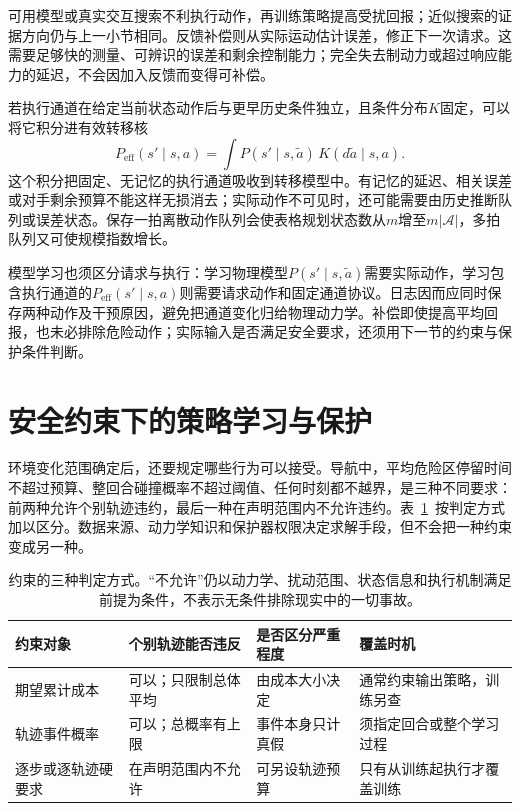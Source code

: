 可用模型或真实交互搜索不利执行动作，再训练策略提高受扰回报；近似搜索的证据方向仍与上一小节相同。反馈补偿则从实际运动估计误差，修正下一次请求。这需要足够快的测量、可辨识的误差和剩余控制能力；完全失去制动力或超过响应能力的延迟，不会因加入反馈而变得可补偿。

若执行通道在给定当前状态动作后与更早历史条件独立，且条件分布$K$固定，可以将它积分进有效转移核
\[
  P_{\mathrm{eff}}(s'\mid s,a)
    =\int P(s'\mid s,\widetilde a)\,K(d\widetilde a\mid s,a).
\]
这个积分把固定、无记忆的执行通道吸收到转移模型中。有记忆的延迟、相关误差或对手剩余预算不能这样无损消去；实际动作不可见时，还可能需要由历史推断队列或误差状态。保存一拍离散动作队列会使表格规划状态数从$m$增至$m|\mathcal A|$，多拍队列又可使规模指数增长。

模型学习也须区分请求与执行：学习物理模型$P(s'\mid s,\widetilde a)$需要实际动作，学习包含执行通道的$P_{\mathrm{eff}}(s'\mid s,a)$则需要请求动作和固定通道协议。日志因而应同时保存两种动作及干预原因，避免把通道变化归给物理动力学。补偿即使提高平均回报，也未必排除危险动作；实际输入是否满足安全要求，还须用下一节的约束与保护条件判断。

\section{安全约束下的策略学习与保护}
\label{sec:rl-trustworthy-safety}

环境变化范围确定后，还要规定哪些行为可以接受。导航中，平均危险区停留时间不超过预算、整回合碰撞概率不超过阈值、任何时刻都不越界，是三种不同要求：前两种允许个别轨迹违约，最后一种在声明范围内不允许违约。表~\ref{tab:rl-trustworthy-constraint-types}~按判定方式加以区分。数据来源、动力学知识和保护器权限决定求解手段，但不会把一种约束变成另一种。

\begin{table}[htbp]
  \centering
  \begin{tabularx}{\linewidth}{@{}>{\raggedright\arraybackslash}p{22mm}XXX@{}}
    \toprule
    约束对象 & 个别轨迹能否违反 & 是否区分严重程度 & 覆盖时机 \\
    \midrule
    期望累计成本 & 可以；只限制总体平均 & 由成本大小决定 & 通常约束输出策略，训练另查 \\
    轨迹事件概率 & 可以；总概率有上限 & 事件本身只计真假 & 须指定回合或整个学习过程 \\
    逐步或逐轨迹硬要求 & 在声明范围内不允许 & 可另设轨迹预算 & 只有从训练起执行才覆盖训练 \\
    \bottomrule
  \end{tabularx}
  \caption{约束的三种判定方式。“不允许”仍以动力学、扰动范围、状态信息和执行机制满足前提为条件，不表示无条件排除现实中的一切事故。}
  \label{tab:rl-trustworthy-constraint-types}
\end{table}


